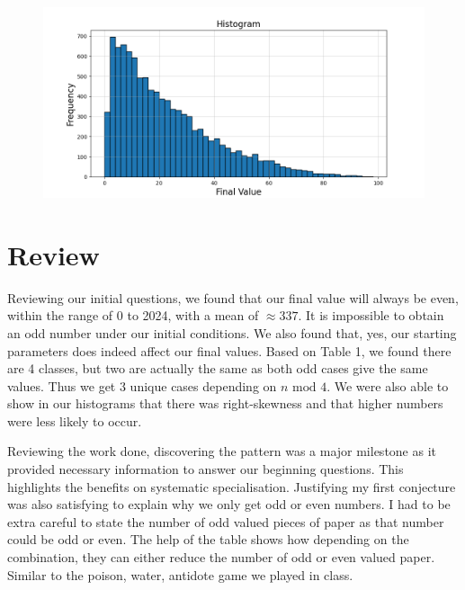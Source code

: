 \documentclass[11pt]{article}
\newcommand{\keywordfont}{\textsc}
\newcommand{\keyword}[1]{%
  \marginpar{\raggedright\small\keywordfont{#1}}}
\begin{document}
\begin{figure}[h] 
   \centering
   \includegraphics[width=5in]{hist2.png}
   \label{myfig}
\end{figure}


\section{Review} %



Reviewing our initial questions, \keyword{Check} we found that our final value will always be even, within the range of 0 to 2024, with a mean of  $\approx337$. It is impossible to obtain an odd number under our initial conditions. We also found that, yes, our starting parameters does indeed affect our final values. Based on Table 1, we found there are 4 classes, but two are actually the same as both odd cases give the same values. Thus we get 3 unique cases depending on $n \text{ mod } 4$. We were also able to show in our histograms that there was right-skewness and that higher numbers were less likely to occur. 

Reviewing the work done, \keyword{Reflect} discovering the pattern was a major milestone as it provided necessary information to answer our beginning questions. This highlights the benefits on systematic specialisation. Justifying my first conjecture was also satisfying to explain why we only get odd or even numbers. I had to be extra careful to state the number of odd valued pieces of paper as that number could be odd or even. The help of the table shows how depending on the combination, they can either reduce the number of odd or even valued paper. Similar to the poison, water, antidote game we played in class. 
\end{document}
